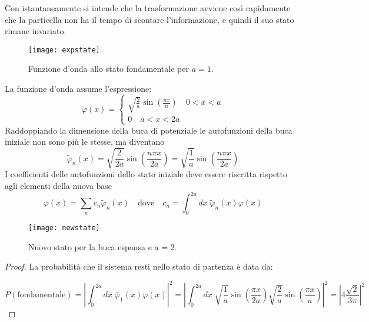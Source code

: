 Con istantaneamente si intende che la trasformazione avviene cos\`i rapidamente che la particella non ha il tempo di scontare l'informazione, e quindi il suo stato rimane invariato.
\begin{wrapfigure}{l}{0.4\textwidth} %
    \centering
    \texttt{[image: expstate]} %
    \caption{Funzione d'onda allo stato fondamentale per $a=1$.}
\end{wrapfigure}
La funzione d'onda assume l'espressione: 
\begin{equation*}
	\varphi(x) = \left \{ \begin{array}{l}
		 \sqrt{\frac{2}{a}} \sin \left ( \frac{\pi x}{a}\right) \quad 0 <x < a \\[0.5cm]
		 0 \quad a < x <2a
	\end{array}\right.
\end{equation*} 
Raddoppiando la dimensione della buca di potenziale  le autofunzioni della buca iniziale non sono pi\`u le stesse, ma diventano 
\begin{equation*}
	\tilde{\varphi}_n(x) = \sqrt{\frac{2}{2a}}\sin \left (\frac{n\pi x }{2a}\right) = \sqrt{\frac{1}{a}} \sin \left( \frac{n\pi x}{2a}\right) 
\end{equation*}
\newline
I coefficienti delle autofunzioni dello stato iniziale deve essere riscritta rispetto agli elementi della nuova base 
\begin{equation*}
	\varphi(x) = \sum_{n}c_n \tilde{\varphi}_n(x) \quad \text{dove} \quad c_n = \int_0^{2a}dx \; \tilde{\varphi}_n(x) \varphi(x)
\end{equation*}

\begin{figure}[!ht]
\texttt{[image: newstate]}	
\centering
\caption{Nuovo stato per la buca espansa e a = 2.}
\end{figure}

\newpage 

\begin{proof}
La probabilit\`a che il sistema resti nello stato di partenza \`e data da: 

	\begin{equation*}
		P(\text{fondamentale}) = \left | \int_{0}^{2a}dx \;  \tilde{\varphi_1}(x)\varphi(x) \right |^2 = \left | \int_0^{2a}dx \; \sqrt{\frac{1}{a}}\sin \left(\frac{\pi x}{2a} \right)\sqrt{\frac{2}{a}}\sin \left( \frac{\pi x}{a}\right) \right|^2 = \left| 4\frac{\sqrt{2}}{3\pi}\right|^2
	\end{equation*}
	
\end{proof}
